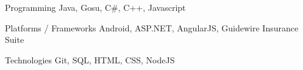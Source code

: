 

\begin{cvskills}

  \cvskill
    {Programming} %
    {Java, Gosu, C\#, C++, Javascript} %

  \cvskill
    {Platforms / Frameworks} %
    {Android, ASP.NET, AngularJS, Guidewire Insurance Suite} %

  \cvskill
    {Technologies} %
    {Git, SQL, HTML, CSS, NodeJS} %

\end{cvskills}